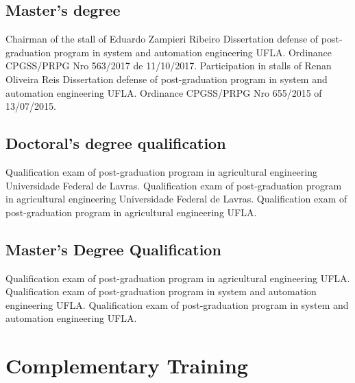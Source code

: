 \documentclass[11pt,a4paper,sans]{moderncv} %
\begin{document}
\subsection{Master's degree}
			{Chairman of the stall of Eduardo Zampieri Ribeiro}
			{Dissertation defense of post-graduation program  in system and automation engineering }{}
			{UFLA. Ordinance CPGSS/PRPG Nro 563/2017 de 11/10/2017.}
			{Participation in stalls of Renan Oliveira Reis}
			{Dissertation defense of post-graduation program  in system and automation engineering }{}
			{UFLA. Ordinance CPGSS/PRPG Nro 655/2015 of 13/07/2015.}

\subsection{Doctoral's degree qualification}
			{}
			{Qualification exam of post-graduation program  in agricultural engineering}{}
			{Universidade Federal de Lavras.}
			{}
			{Qualification exam of post-graduation program  in agricultural engineering}{}
			{Universidade Federal de Lavras.}
			{}
			{Qualification exam of post-graduation program  in agricultural engineering}{}
			{UFLA. }

\subsection{Master's Degree Qualification}
			{}
			{Qualification exam of post-graduation program  in agricultural engineering}{}
			{UFLA.}
			{}
			{Qualification exam of post-graduation program  in system and automation engineering}{}
			{UFLA.}
			{}
			{Qualification exam of post-graduation program  in system and automation engineering}{}
			{UFLA. }



\section{Complementary Training}
\end{document}

